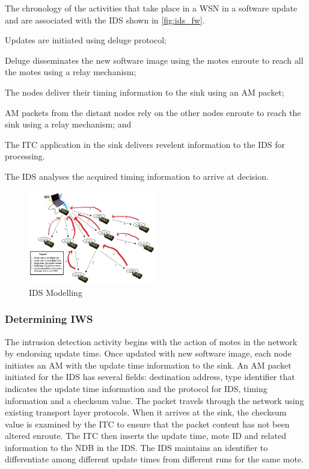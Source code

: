 \documentclass[conference,final]{IEEEtran}
\begin{document}
The chronology of the activities that take place in a WSN in a software  update and are associated with the IDS shown in \ref{fig:ids_fw}.
\begin{inparaenum}
\item Updates are initiated using deluge protocol;
\item Deluge disseminates the new software image using the motes enroute to reach all the motes using a relay mechanism; 
\item The nodes deliver their timing information to the sink using an AM packet;
\item AM packets from the distant nodes rely on the other nodes enroute to reach the sink using a relay mechanism; and
\item The ITC application in the sink delivers revelent information to the IDS for processing. 
\end{inparaenum}
The IDS analyses the acquired timing information to arrive at decision.
\begin{figure}[btp]
    \centering
    \includegraphics[width=0.5\textwidth]{IDS}
    \caption{IDS Modelling}
    \label{fig:ids_model}
\end{figure}

\subsubsection{Determining IWS}
\label{ssc:cal_iws}

The intrusion detection activity begins with the action of motes in the network by endorsing update time. 
Once updated with new software image, each node initiates an AM with the update time information to the sink. 
An AM packet initiated for the IDS has several fields: destination address, type identifier that indicates the update time information and the protocol for IDS, timing information and a checksum value.
The packet travels through the network using existing transport layer protocols.
When it arrives at the sink, the checksum value is examined by the ITC to ensure that the packet content has not been altered enroute.
The ITC then inserts the update time, mote ID and related information to the NDB in the IDS.
The IDS maintains an identifier to differentiate among different update times from different runs for the same mote.
\end{document}
